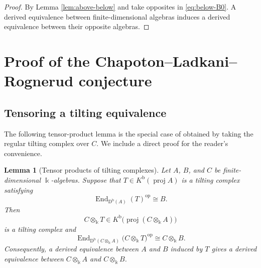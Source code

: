 \documentclass[12pt,a4paper,english,reqno]{amsart}
\theoremstyle{plain}
\newtheorem{lemma}[theorem]{Lemma}
\theoremstyle{definition}
\newcommand{\kk}{\Bbbk}
\newcommand{\Db}{\mathrm D^{\mathrm b}}
\newcommand{\End}{\operatorname{End}}
\newcommand{\op}{\mathrm{op}}
\begin{document}
\begin{proof}
 By Lemma \ref{lem:above-below} and take opposites in \eqref{eq:below-B0}. A derived equivalence between finite-dimensional
algebras induces a derived equivalence between their opposite algebras.
\end{proof}


\section{Proof of the Chapoton--Ladkani--Rognerud conjecture}
\label{sec:conjecture}

\subsection{Tensoring a tilting equivalence}

The following tensor-product lemma is the special case of
\cite[Theorem~2.1]{Rickard1991} obtained by taking the regular
tilting complex over $C$.  We include a direct proof for the
reader's convenience.

\begin{lemma}[Tensor products of tilting complexes]
\label{lem:tensor-tilting}
Let $A$, $B$, and $C$ be finite-dimensional $\kk$-algebras.  Suppose that
$T\in K^{\mathrm b}(\operatorname{proj}A)$ is a tilting complex satisfying
\[
 \End_{\Db(A)}(T)^{\op}\cong B.
\]
Then
\[
 C\otimes_{\kk}T
 \in
 K^{\mathrm b}
 \bigl(\operatorname{proj}(C\otimes_{\kk}A)\bigr)
\]
is a tilting complex and
\[
 \End_{\Db(C\otimes_{\kk}A)}
 \bigl(C\otimes_{\kk}T\bigr)^{\op}
 \cong
 C\otimes_{\kk}B.
\]
Consequently, a derived equivalence between $A$ and $B$ induced by $T$
gives a derived equivalence between
$C\otimes_{\kk}A$ and $C\otimes_{\kk}B$.
\end{lemma}
\end{document}
